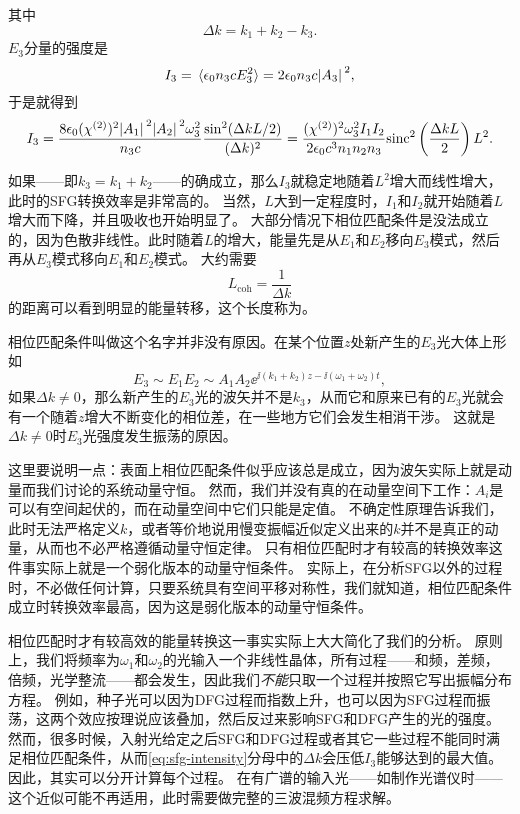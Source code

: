 其中
\begin{equation}
    \Delta k = k_1 + k_2 - k_3.
\end{equation}
$E_3$分量的强度是
\[
    I_3 = \expval*{\epsilon_0 n_3 c E_3^2} = 2 \epsilon_0 n_3 c \abs*{A_3}^2,
\]
于是就得到
\begin{equation}
    I_3 = \frac{8 \epsilon_0 (\chi^{(2)})^2 \abs*{A_1}^2 \abs*{A_2}^2 \omega_3^2}{n_3 c} \frac{\sin^2(\Delta k L / 2)}{(\Delta k)^2} = \frac{(\chi^{(2)})^2 \omega_3^2 I_1 I_2}{2 \epsilon_0 c^3 n_1 n_2 n_3} \mathrm{sinc}^2 \left( \frac{\Delta k L}{2} \right) L^2.
    \label{eq:sfg-intensity}
\end{equation}

如果——即$k_3 = k_1 + k_2$——的确成立，那么$I_3$就稳定地随着$L^2$增大而线性增大，此时的SFG转换效率是非常高的。
当然，$L$大到一定程度时，$I_1$和$I_2$就开始随着$L$增大而下降，并且吸收也开始明显了。
大部分情况下相位匹配条件是没法成立的，因为色散非线性。此时随着$L$的增大，能量先是从$E_1$和$E_2$移向$E_3$模式，然后再从$E_3$模式移向$E_1$和$E_2$模式。
大约需要
\begin{equation}
    L_\text{coh} = \frac{1}{\Delta k}
\end{equation}
的距离可以看到明显的能量转移，这个长度称为。

相位匹配条件叫做这个名字并非没有原因。在某个位置$z$处新产生的$E_3$光大体上形如
\[
    E_3 \sim E_1 E_2 \sim A_1 A_2 \ee^{\ii (k_1 + k_2) z - \ii (\omega_1 + \omega_2) t},
\]
如果$\Delta k \neq 0$，那么新产生的$E_3$光的波矢并不是$k_3$，从而它和原来已有的$E_3$光就会有一个随着$z$增大不断变化的相位差，在一些地方它们会发生相消干涉。
这就是$\Delta k \neq 0$时$E_3$光强度发生振荡的原因。

这里要说明一点：表面上相位匹配条件似乎应该总是成立，因为波矢实际上就是动量而我们讨论的系统动量守恒。
然而，我们并没有真的在动量空间下工作：$A_i$是可以有空间起伏的，而在动量空间中它们只能是定值。
不确定性原理告诉我们，此时无法严格定义$k$，或者等价地说用慢变振幅近似定义出来的$k$并不是真正的动量，从而也不必严格遵循动量守恒定律。
只有相位匹配时才有较高的转换效率这件事实际上就是一个弱化版本的动量守恒条件。
实际上，在分析SFG以外的过程时，不必做任何计算，只要系统具有空间平移对称性，我们就知道，相位匹配条件成立时转换效率最高，因为这是弱化版本的动量守恒条件。

相位匹配时才有较高效的能量转换这一事实实际上大大简化了我们的分析。
原则上，我们将频率为$\omega_1$和$\omega_2$的光输入一个非线性晶体，所有过程——和频，差频，倍频，光学整流——都会发生，因此我们\emph{不能}只取一个过程并按照它写出振幅分布方程。
例如，种子光可以因为DFG过程而指数上升，也可以因为SFG过程而振荡，这两个效应按理说应该叠加，然后反过来影响SFG和DFG产生的光的强度。
然而，很多时候，入射光给定之后SFG和DFG过程或者其它一些过程不能同时满足相位匹配条件，从而\eqref{eq:sfg-intensity}分母中的$\Delta k$会压低$I_3$能够达到的最大值。
因此，其实可以分开计算每个过程。
在有广谱的输入光——如制作光谱仪时——这个近似可能不再适用，此时需要做完整的三波混频方程求解。

